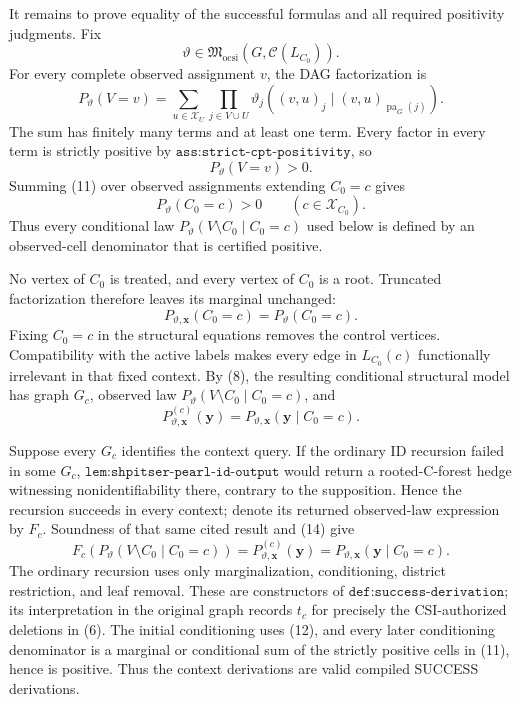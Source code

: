 It remains to prove equality of the successful formulas and all required positivity judgments.  Fix
\[
\vartheta\in
\mathfrak M_{\mathrm{ocsi}}\!\left(G,\mathcal C(L_{C_0})\right).
\]
For every complete observed assignment \(v\), the DAG factorization is
\[
P_\vartheta(V=v)
=\sum_{u\in\mathcal X_U}
  \prod_{j\in V\cup U}
  \vartheta_j\!\left((v,u)_j\mid
  (v,u)_{\operatorname{pa}_G(j)}\right).
\tag{10}
\]
The sum has finitely many terms and at least one term.  Every factor in every term is strictly positive by \(\texttt{ass:strict-cpt-positivity}\), so
\[
P_\vartheta(V=v)>0.
\tag{11}
\]
Summing (11) over observed assignments extending \(C_0=c\) gives
\[
P_\vartheta(C_0=c)>0
\qquad(c\in\mathcal X_{C_0}).
\tag{12}
\]
Thus every conditional law \(P_\vartheta(V\setminus C_0\mid C_0=c)\) used below is defined by an observed-cell denominator that is certified positive.

No vertex of \(C_0\) is treated, and every vertex of \(C_0\) is a root.  Truncated factorization therefore leaves its marginal unchanged:
\[
P_{\vartheta,\mathbf x}(C_0=c)=P_\vartheta(C_0=c).
\tag{13}
\]
Fixing \(C_0=c\) in the structural equations removes the control vertices.  Compatibility with the active labels makes every edge in \(L_{C_0}(c)\) functionally irrelevant in that fixed context.  By (8), the resulting conditional structural model has graph \(G_c\), observed law \(P_\vartheta(V\setminus C_0\mid C_0=c)\), and
\[
P^{(c)}_{\vartheta,\mathbf x}(\mathbf y)
=P_{\vartheta,\mathbf x}(\mathbf y\mid C_0=c).
\tag{14}
\]

Suppose every \(G_c\) identifies the context query.  If the ordinary \(\mathrm{ID}\) recursion failed in some \(G_c\), \(\texttt{lem:shpitser-pearl-id-output}\) would return a rooted-C-forest hedge witnessing nonidentifiability there, contrary to the supposition.  Hence the recursion succeeds in every context; denote its returned observed-law expression by \(F_c\).  Soundness of that same cited result and (14) give
\[
F_c\!\left(P_\vartheta(V\setminus C_0\mid C_0=c)\right)
=P^{(c)}_{\vartheta,\mathbf x}(\mathbf y)
=P_{\vartheta,\mathbf x}(\mathbf y\mid C_0=c).
\tag{15}
\]
The ordinary recursion uses only marginalization, conditioning, district restriction, and leaf removal.  These are constructors of \(\texttt{def:success-derivation}\); its interpretation in the original graph records \(t_c\) for precisely the CSI-authorized deletions in (6).  The initial conditioning uses (12), and every later conditioning denominator is a marginal or conditional sum of the strictly positive cells in (11), hence is positive.  Thus the context derivations are valid compiled SUCCESS derivations.

